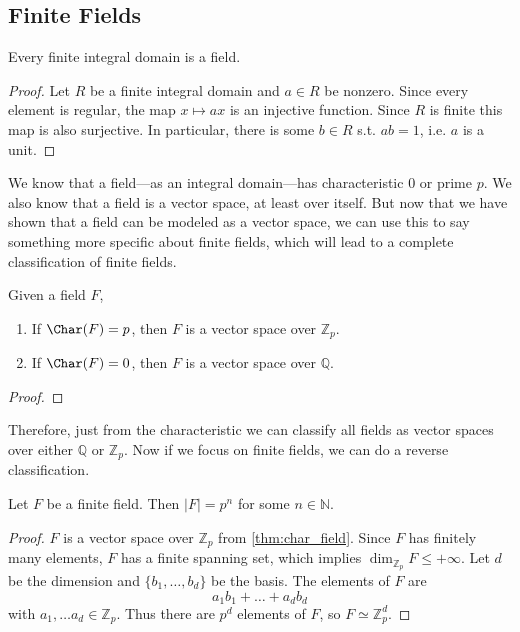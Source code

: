 \subsection{Finite Fields} 

  \begin{theorem}
    Every finite integral domain is a field. 
  \end{theorem} 
  \begin{proof}
    Let $R$ be a finite integral domain and $a \in R$ be nonzero. Since every element is regular, the map $x \mapsto ax$ is an injective function. Since $R$ is finite this map is also surjective. In particular, there is some $b \in R$ s.t. $ab = 1$, i.e. $a$ is a unit. 
  \end{proof}

  We know that a field---as an integral domain---has characteristic $0$ or prime $p$. We also know that a field is a vector space, at least over itself. But now that we have shown that a field can be modeled as a vector space, we can use this to say something more specific about finite fields, which will lead to a complete classification of finite fields. 

  \begin{theorem}
    \label{thm:char_field}
    Given a field $F$, 
    \begin{enumerate}
      \item If $\Char(F) = p$, then $F$ is a vector space over $\mathbb{Z}_p$. 
      \item If $\Char(F) = 0$, then $F$ is a vector space over $\mathbb{Q}$. 
    \end{enumerate}
  \end{theorem}
  \begin{proof}
    
  \end{proof} 

  Therefore, just from the characteristic we can classify all fields as vector spaces over either $\mathbb{Q}$ or $\mathbb{Z}_p$. Now if we focus on finite fields, we can do a reverse classification. 

  \begin{theorem}
    Let $F$ be a finite field. Then $|F| = p^n$ for some $n \in \mathbb{N}$. 
  \end{theorem}
  \begin{proof}
    $F$ is a vector space over $\mathbb{Z}_p$ from \ref{thm:char_field}. Since $F$ has finitely many elements, $F$ has a finite spanning set, which implies $\dim_{\mathbb{Z}_p} F \leq + \infty$. Let $d$ be the dimension and $\{b_1, \ldots, b_d\}$ be the basis. The elements of $F$ are 
    \begin{equation}
      a_1 b_1 + \ldots + a_d b_d
    \end{equation}
    with $a_1, \ldots a_d \in \mathbb{Z}_p$. Thus there are $p^d$ elements of $F$, so $F \simeq \mathbb{Z}_p^d$. 
  \end{proof}

